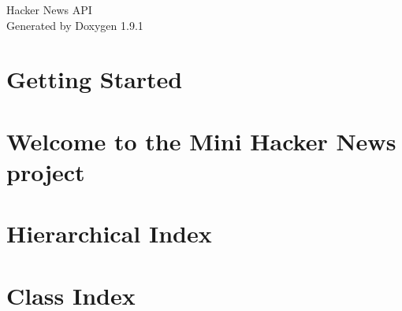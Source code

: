 \let\mypdfximage\pdfximage\def\pdfximage{\immediate\mypdfximage}\documentclass[twoside]{book}
\newcommand{\+}{\discretionary{\mbox{\scriptsize$\hookleftarrow$}}{}{}}
\newcommand{\clearemptydoublepage}{%
  \newpage{\pagestyle{empty}\cleardoublepage}%
}
\begin{document}
\raggedbottom

\hypersetup{pageanchor=false,
             bookmarksnumbered=true,
             pdfencoding=unicode
            }
\begin{titlepage}
\vspace*{7cm}
\begin{center}%
{\Large Hacker News API }\\
\vspace*{1cm}
{\large Generated by Doxygen 1.9.1}\\
\end{center}
\end{titlepage}
\clearemptydoublepage
{}
\tableofcontents
\clearemptydoublepage
{}
\hypersetup{pageanchor=true}

\chapter{Getting Started}
\label{md_HELP}

\chapter{Welcome to the Mini Hacker News project}
\label{md_README}

\chapter{Hierarchical Index}

\chapter{Class Index}

\end{document}
